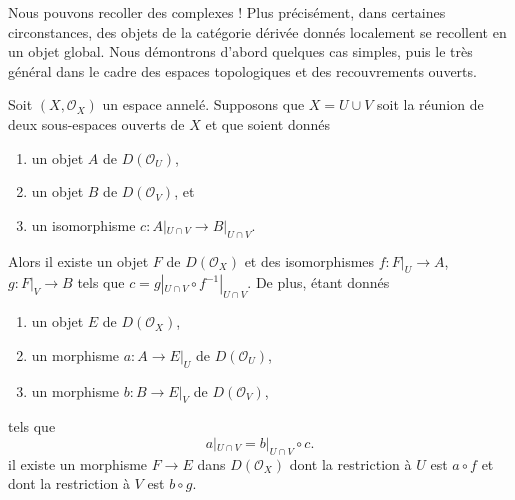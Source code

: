 \label{section-glueing-complexes}

\noindent
Nous pouvons recoller des complexes ! Plus précisément, dans certaines circonstances, des objets de la catégorie dérivée donnés localement se recollent en un objet global. Nous démontrons d'abord quelques cas simples, puis le très général \cite[théorème 3.2.4]{BBD} dans le cadre des espaces topologiques et des recouvrements ouverts.

\begin{lemma}

\label{lemma-glue}

Soit $(X, \mathcal{O}_X)$ un espace annelé. Supposons que $X = U \cup V$ soit la réunion de deux sous-espaces ouverts de $X$ et que soient donnés

\begin{enumerate}

\item un objet $A$ de $D(\mathcal{O}_U)$,
\item un objet $B$ de $D(\mathcal{O}_V)$, et
\item un isomorphisme $c : A|_{U \cap V} \to B|_{U \cap V}$.

\end{enumerate}

Alors il existe un objet $F$ de $D(\mathcal{O}_X)$
et des isomorphismes $f : F|_U \to A$, $g : F|_V \to B$ tels que $c = g|_{U \cap V} \circ f^{-1}|_{U \cap V}$. De plus, étant donnés

\begin{enumerate}

\item un objet $E$ de $D(\mathcal{O}_X)$,
\item un morphisme $a : A \to E|_U$ de $D(\mathcal{O}_U)$,
\item un morphisme $b : B \to E|_V$ de $D(\mathcal{O}_V)$, 

\end{enumerate}

tels que
$$
a|_{U \cap V}  = b|_{U \cap V} \circ c.
$$
il existe un morphisme $F \to E$ dans $D(\mathcal{O}_X)$
dont la restriction à $U$ est $a \circ f$
et dont la restriction à $V$ est $b \circ g$.

\end{lemma}

